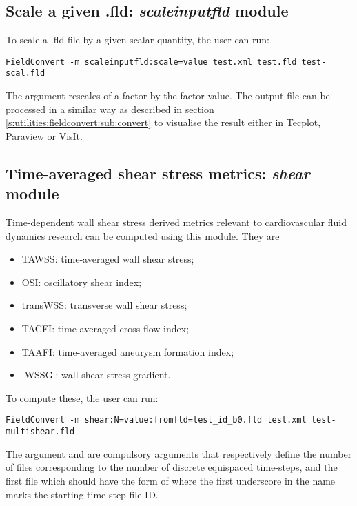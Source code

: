 %
%
%

\subsection{Scale a given .fld: \textit{scaleinputfld} module}
To scale a .fld file by a given scalar quantity, the user can run:
\begin{lstlisting}[style=BashInputStyle] 
FieldConvert -m scaleinputfld:scale=value test.xml test.fld test-scal.fld
\end{lstlisting}
The argument  rescales of a factor  
 by the factor value.
The output file  can be processed in a similar 
way as described in section \ref{s:utilities:fieldconvert:sub:convert}
to visualise the result  either in Tecplot, Paraview or VisIt.

%
%
%
\subsection{Time-averaged shear stress metrics: \textit{shear} module}
Time-dependent wall shear stress derived metrics relevant to cardiovascular fluid dynamics research can be computed using this module. They are

\begin{itemize}
\item TAWSS: time-averaged wall shear stress;
\item OSI: oscillatory shear index;
\item transWSS: transverse wall shear stress;
\item TACFI: time-averaged cross-flow index;
\item TAAFI: time-averaged aneurysm formation index;
\item |WSSG|: wall shear stress gradient.
\end{itemize}

To compute these, the user can run:
\begin{lstlisting}[style=BashInputStyle] 
FieldConvert -m shear:N=value:fromfld=test_id_b0.fld test.xml test-multishear.fld
\end{lstlisting}
The argument  and  are compulsory arguments that respectively define the number of  files corresponding to the number of discrete equispaced time-steps, and the first  file which should have the form of  where the first underscore in the name marks the starting time-step file ID. 


